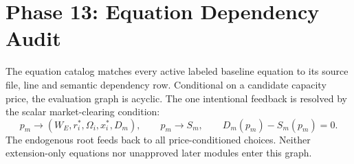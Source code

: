 \documentclass[11pt]{article}
\begin{document}
\section*{Phase 13: Equation Dependency Audit}
The equation catalog matches every active labeled baseline equation to its
source file, line and semantic dependency row. Conditional on a candidate
capacity price, the evaluation graph is acyclic. The one intentional feedback
is resolved by the scalar market-clearing condition:
\[
p_m\longrightarrow (W_E,r_i^*,\Omega_i,x_i^*,D_m),\qquad
p_m\longrightarrow S_m,\qquad D_m(p_m)-S_m(p_m)=0.
\]
The endogenous root feeds back to all price-conditioned choices. Neither
extension-only equations nor unapproved later modules enter this graph.
\end{document}
